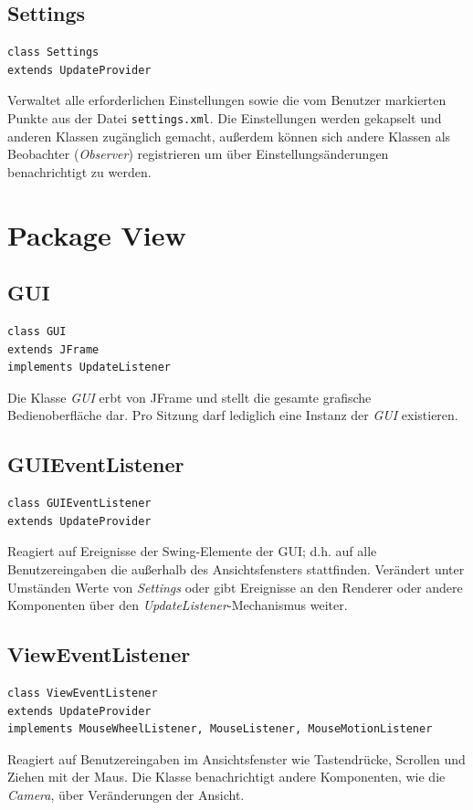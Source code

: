 \documentclass[10pt]{scrreprt}
\begin{document}
\subsection*{Settings}
\begin{lstlisting}
class Settings 
extends UpdateProvider
\end{lstlisting}
Verwaltet alle erforderlichen Einstellungen sowie die vom Benutzer markierten Punkte aus der Datei \texttt{settings.xml}. Die Einstellungen werden gekapselt und anderen Klassen zugänglich gemacht, außerdem können sich andere Klassen als Beobachter (\textit{Observer}) registrieren um über Einstellungsänderungen benachrichtigt zu werden.\\



\section{Package View}
\subsection*{GUI}
\begin{lstlisting}
class GUI 
extends JFrame 
implements UpdateListener
\end{lstlisting}
Die Klasse \textit{GUI} erbt von JFrame und stellt die gesamte grafische Bedienoberfläche dar. Pro Sitzung darf lediglich eine Instanz der \textit{GUI} existieren.\\

\subsection*{GUIEventListener}
\begin{lstlisting}
class GUIEventListener
extends UpdateProvider
\end{lstlisting}
Reagiert auf Ereignisse der Swing-Elemente der GUI; d.h. auf alle Benutzereingaben die außerhalb des Ansichtsfensters stattfinden. Verändert unter Umständen Werte von \textit{Settings} oder gibt Ereignisse an den Renderer oder andere Komponenten über den \textit{UpdateListener}-Mechanismus weiter.\\

\subsection*{ViewEventListener}
\begin{lstlisting}
class ViewEventListener
extends UpdateProvider 
implements MouseWheelListener, MouseListener, MouseMotionListener
\end{lstlisting}
Reagiert auf Benutzereingaben im Ansichtsfenster wie Tastendrücke, Scrollen und Ziehen mit der Maus. Die Klasse benachrichtigt andere Komponenten, wie die \textit{Camera}, über Veränderungen der Ansicht. \\
\end{document}
